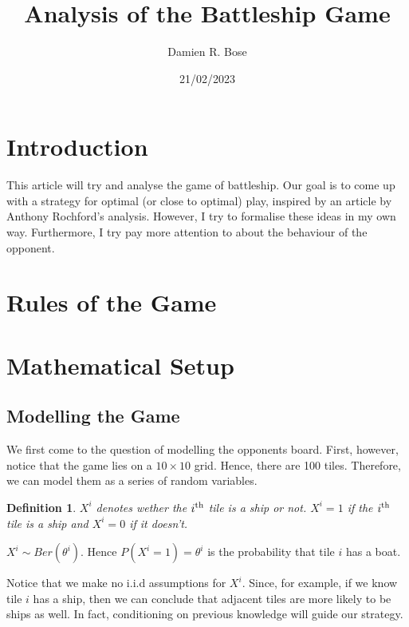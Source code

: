 \documentclass[11pt]{article}
\newtheorem{definition}{Definition}
\begin{document}
\title{Analysis of the Battleship Game}
\author{Damien R. Bose}
\date{21/02/2023}

\maketitle

\section{Introduction}

This article will try and analyse the game of battleship. Our goal is to come up with a strategy for optimal (or close to optimal) play, inspired by an article by Anthony Rochford's analysis\cite{rochford}. However, I try to formalise these ideas in my own way. Furthermore, I try pay more attention to about the behaviour of the opponent. 

\section{Rules of the Game\cite{rules}}

\section{Mathematical Setup}
\subsection{Modelling the Game}

We first come to the question of modelling the opponents board. First, however, notice that the game lies on a $10 \times 10$ grid. Hence, there are 100 tiles. Therefore, we can model them as a series of random variables.

\begin{definition}
$X^i$ denotes wether the $i\textsuperscript{th}$ tile is a ship or not. $X^i = 1$ if the $i\textsuperscript{th}$ tile is a ship and $X^i = 0$ if it doesn't.
\end{definition}

$X^i \sim Ber(\theta^i)$. Hence $P(X^i = 1) = \theta^i$ is the probability that tile $i$ has a boat.

Notice that we make no i.i.d assumptions for $X^i$. Since, for example, if we know tile $i$ has a ship, then we can conclude that adjacent tiles are more likely to be ships as well. In fact, conditioning on previous knowledge will guide our strategy.
\end{document}
